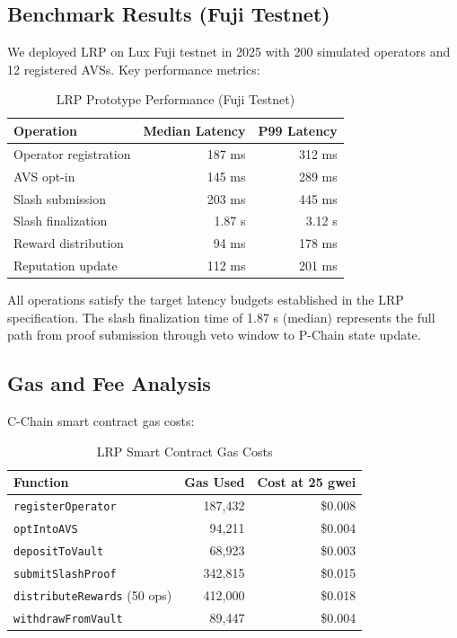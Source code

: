 \documentclass[11pt]{article}
\begin{document}
\subsection{Benchmark Results (Fuji Testnet)}

We deployed LRP on Lux Fuji testnet in 2025 with 200 simulated operators and
12 registered AVSs. Key performance metrics:

\begin{table}[H]
\centering
\caption{LRP Prototype Performance (Fuji Testnet)}
\label{tab:perf}
\begin{tabular}{lrr}
\toprule
\textbf{Operation} & \textbf{Median Latency} & \textbf{P99 Latency} \\
\midrule
Operator registration & 187 ms & 312 ms \\
AVS opt-in & 145 ms & 289 ms \\
Slash submission & 203 ms & 445 ms \\
Slash finalization & 1.87 s & 3.12 s \\
Reward distribution & 94 ms & 178 ms \\
Reputation update & 112 ms & 201 ms \\
\bottomrule
\end{tabular}
\end{table}

All operations satisfy the target latency budgets established in the LRP specification.
The slash finalization time of 1.87 s (median) represents the full path from proof
submission through veto window to P-Chain state update.

\subsection{Gas and Fee Analysis}

C-Chain smart contract gas costs:

\begin{table}[H]
\centering
\caption{LRP Smart Contract Gas Costs}
\label{tab:gas}
\begin{tabular}{lrr}
\toprule
\textbf{Function} & \textbf{Gas Used} & \textbf{Cost at 25 gwei} \\
\midrule
\texttt{registerOperator} & 187,432 & \$0.008 \\
\texttt{optIntoAVS} & 94,211 & \$0.004 \\
\texttt{depositToVault} & 68,923 & \$0.003 \\
\texttt{submitSlashProof} & 342,815 & \$0.015 \\
\texttt{distributeRewards} (50 ops) & 412,000 & \$0.018 \\
\texttt{withdrawFromVault} & 89,447 & \$0.004 \\
\bottomrule
\end{tabular}
\end{table}
\end{document}
